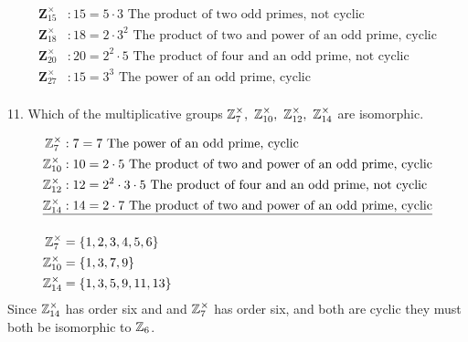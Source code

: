\begin{mdframed}[style=darkAnswer,frametitle={Joe Starr}]
 \begin{align*}
  \mathbf{Z}_{15}^{\times}&:15=5\cdot3 \text{ The product of two odd primes, not cyclic}\\
  \mathbf{Z}_{18}^{\times}&:18=2\cdot3^2 \text{ The product of two and power of an odd prime, cyclic}\\
  \mathbf{Z}_{20}^{\times}&:20=2^2\cdot5 \text{ The product of four and an odd prime, not cyclic}\\
  \mathbf{Z}_{27}^{\times}&:15=3^3 \text{ The power of an odd prime, cyclic}\\
 \end{align*}
\end{mdframed}
\newpage
\begin{mdframed}[style=darkQuesion]
11. Which of the multiplicative groups  $\Z^{\times}_{7},\ \Z^{\times}_{10},\ \Z^{\times}_{12},\ \Z^{\times}_{14}$ are isomorphic.
\end{mdframed}
\begin{mdframed}[style=darkAnswer,frametitle={Joe Starr}]
  \begin{align*}
    \mathbf{\mathbb{Z}}_{7 }^{\times}&:7 =7 \text{ The power of an odd prime, cyclic}\\
    \mathbf{\mathbb{Z}}_{10}^{\times}&:10=2\cdot5 \text{ The product of two and power of an odd prime, cyclic}\\
    \mathbf{\mathbb{Z}}_{12}^{\times}&:12=2^2\cdot3\cdot5 \text{ The product of four and an odd prime, not cyclic}\\
    \mathbf{\mathbb{Z}}_{14}^{\times}&:14=2\cdot7 \text{ The product of two and power of an odd prime, cyclic}\\
   \hline \\
    \mathbf{\mathbb{Z}}_{7 }^{\times}&=\left\{1, 2, 3, 4, 5, 6\right\} \\
    \mathbf{\mathbb{Z}}_{10}^{\times}&=\left\{1, 3, 7, 9\right\} \\
    \mathbf{\mathbb{Z}}_{14}^{\times}&=\left\{1, 3, 5, 9, 11, 13\right\} \\
   \end{align*}
   Since $\mathbb{Z}_{14}^{\times}$ has order six and and $\mathbb{Z}_{7}^{\times}$ has order six, 
   and both are cyclic they must both be isomorphic to $\mathbb{Z}_{6}$.

\end{mdframed}
